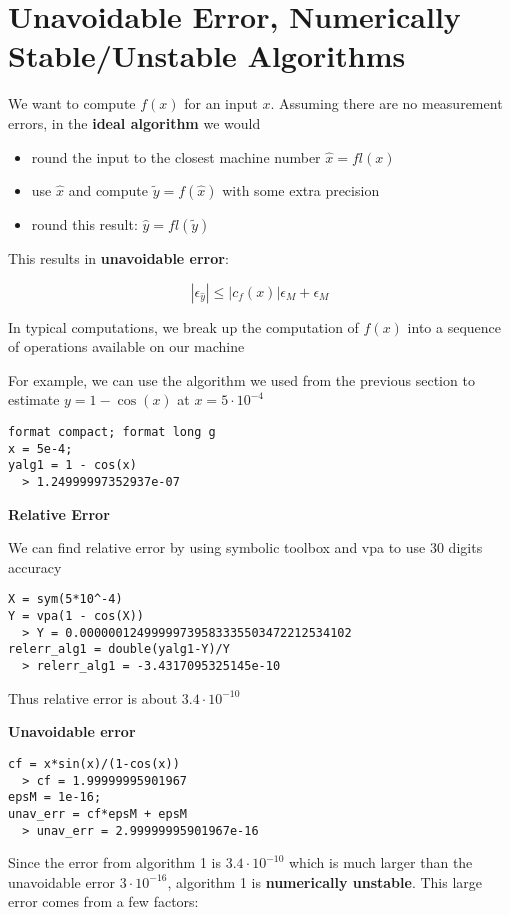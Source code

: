 \documentclass{article}
\begin{document}
  \section{Unavoidable Error, Numerically Stable/Unstable Algorithms}

  We want to compute $f(x)$ for an input $x$. Assuming there are no measurement errors, in the \textbf{ideal algorithm} we would
  \begin{itemize}
    \item round the input to the closest machine number $\hat{x} = fl(x)$
    \item use $\hat{x}$ and compute $\tilde{y} = f(\hat{x})$ with some extra precision
    \item round this result: $\hat{y} = fl(\tilde{y})$
  \end{itemize}

  This results in \textbf{unavoidable error}:

  \[|\epsilon_{\hat{y}}| \leq |c_f(x)| \epsilon_M + \epsilon_M\]

  In typical computations, we break up the computation of $f(x)$ into a sequence of operations available on our machine

  For example, we can use the algorithm we used from the previous section to estimate $y = 1 - \cos(x)$ at $x = 5 \cdot 10^{-4}$

  \begin{lstlisting}
format compact; format long g
x = 5e-4;
yalg1 = 1 - cos(x) 
  > 1.24999997352937e-07
  \end{lstlisting}
  \textbf{Relative Error}

  We can find relative error by using symbolic toolbox and vpa to use 30 digits accuracy
\begin{lstlisting}
X = sym(5*10^-4)
Y = vpa(1 - cos(X))
  > Y = 0.00000012499999739583335503472212534102
relerr_alg1 = double(yalg1-Y)/Y
  > relerr_alg1 = -3.4317095325145e-10
  \end{lstlisting}

  Thus relative error is about $3.4 \cdot 10^{-10}$

  \textbf{Unavoidable error}

  \begin{lstlisting}
cf = x*sin(x)/(1-cos(x))
  > cf = 1.99999995901967
epsM = 1e-16;
unav_err = cf*epsM + epsM
  > unav_err = 2.99999995901967e-16
  \end{lstlisting}
  Since the error from algorithm 1 is $3.4 \cdot 10^{-10}$ which is much larger than the unavoidable error $3 \cdot 10^{-16}$, algorithm 1 is \textbf{numerically unstable}. This large error comes from a few factors:
\end{document}

